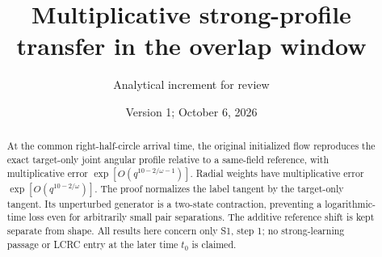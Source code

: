 \documentclass[11pt]{article}
\title{Multiplicative strong-profile transfer in the overlap window}
\author{Analytical increment for review}
\date{Version 1; October 6, 2026}
\theoremstyle{remark}\newtheorem{remark}[theorem]{Remark}
\begin{document}
\maketitle
\begin{abstract}
At the common right-half-circle arrival time, the original initialized
flow reproduces the exact target-only joint angular profile relative
to a same-field reference, with multiplicative error
$\exp[O(q^{10-2/\omega-1})]$. Radial weights have multiplicative
error $\exp[O(q^{10-2/\omega})]$. The proof normalizes the label
tangent by the target-only tangent. Its unperturbed generator is a
two-state contraction, preventing a logarithmic-time loss even for
arbitrarily small pair separations. The additive reference shift
is kept separate from shape. All results here concern only S1,
step 1; no strong-learning passage or LCRC entry at the later time
$t_0$ is claimed.
\end{abstract}
\end{document}
